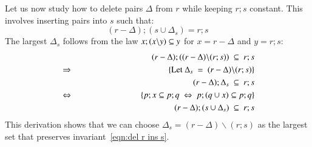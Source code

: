 \documentclass{elsarticle}
\begin{document}
	Let us now study how to delete pairs $\Delta$ from $r$ while keeping $r;s$ constant.
	This involves inserting pairs into $s$ such that:
\begin{equation}
(r-\Delta);(s\cup\Delta_s)=r;s\label{eqn:del r ins s}
\end{equation}
	The largest $\Delta_s$ follows from the law $x;(x\backslash y)\subseteq y$ for $x=r-\Delta$ and $y=r;s$:
\begin{eqnarray}
&&(r-\Delta);((r-\Delta)\backslash(r;s))\ \subs\ r;s\nonumber\\
&\Rightarrow&\hspace{1in}\{\text{Let }\Delta_s\ =\ (r-\Delta)\backslash(r;s)\}\nonumber\\
&&(r-\Delta);\Delta_s\ \subs\ r;s\nonumber\\
&\Leftrightarrow&\hspace{1in}\{p;x\subs p;q\ \Leftrightarrow\ p;(q\cup x)\subs p;q\}\nonumber\\
&&(r-\Delta);(s\cup\Delta_s)\ \subs\ r;s\nonumber
\end{eqnarray}
	This derivation shows that we can choose $\Delta_s=(r-\Delta)\backslash(r;s)$ as the largest set that preserves invariant~\ref{eqn:del r ins s}.
\end{document}
